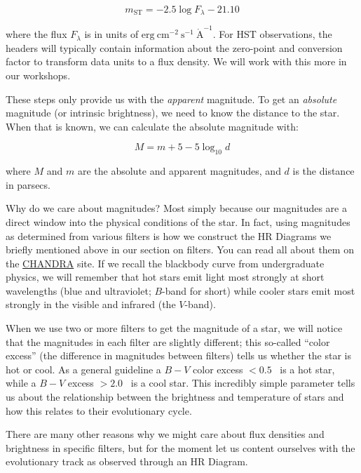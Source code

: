\documentclass{tufte-book}
\begin{document}
\begin{equation}
m_{\mathrm{ST}} = -2.5 \log F_{\lambda} - 21.10
\end{equation}

\noindent where the flux $F_{\lambda}$ is in units of $\mathrm{erg~cm}^{-2}~ \mathrm{s}^{-1}~\mathring{\mathrm{A}}^{-1}$. For HST observations, the headers will typically contain information about the zero-point and conversion factor to transform data units to a flux density. We will work with this more in our workshops.

These steps only provide us with the \textit{apparent} magnitude. To get an \textit{absolute} magnitude (or intrinsic brightness), we need to know the distance to the star. When that is known, we can calculate the absolute magnitude with:

\begin{equation}
    M = m + 5 - 5 \log_{10} d
\end{equation}

\noindent where $M$ and $m$ are the absolute and apparent magnitudes, and $d$ is the distance in parsecs. 

Why do we care about magnitudes? Most simply because our magnitudes are a direct window into the physical conditions of the star. In fact, using magnitudes as determined from various filters is how we construct the HR Diagrams we briefly mentioned above in our section on filters. You can read all about them on the \href{https://chandra.harvard.edu/edu/formal/variable_stars/bg_info.html}{CHANDRA} site. If we recall the blackbody curve from undergraduate physics, we will remember that hot stars emit light most strongly at short wavelengths (blue and ultraviolet; $B$-band for short) while cooler stars emit most strongly in the visible and infrared (the $V$-band). 

When we use two or more filters to get the magnitude of a star, we will notice that the magnitudes in each filter are slightly different; this so-called ``color excess'' (the difference in magnitudes between filters) tells us whether the star is hot or cool. As a general guideline a $B-V$ color excess $<0.5$~ is a hot star, while a $B-V$ excess $>2.0$~ is a cool star. This incredibly simple parameter tells us about the relationship between the brightness and temperature of stars and how this relates to their evolutionary cycle.

There are many other reasons why we might care about flux densities and brightness in specific filters, but for the moment let us content ourselves with the evolutionary track as observed through an HR Diagram.
\end{document}
